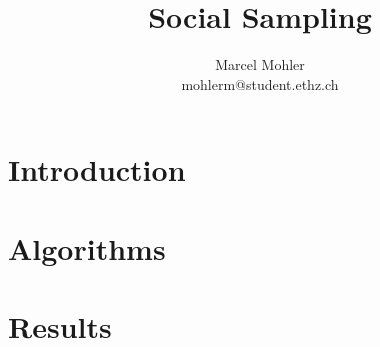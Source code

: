 \documentclass[a4paper,11pt]{article}
\title{\textbf{Social Sampling}}
\author{Marcel Mohler\\
		mohlerm@student.ethz.ch}
\begin{document}
\maketitle

\begin{abstract}

\end{abstract}
\section{Introduction}


\section{Algorithms}


\section{Results}




\end{document}
